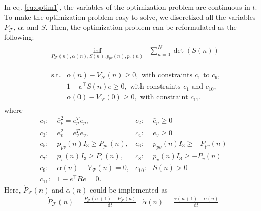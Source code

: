 \documentclass[letterpaper, 10 pt, conference]{ieeeconf}  %
\begin{document}
In eq. \eqref{eq:optim1}, the variables of the optimization problem are continuous in $t$. 
To make the optimization problem easy to solve, 
we discretized all the variables $P_\mathcal{F}$, $\alpha$, and $S$. 
Then, the optimization problem can be reformulated as the following:
\begin{align}
&
\begin{array}{rl}
\displaystyle{\inf_{P_\mathcal{F}(n),\alpha(n),S(n),p_{pv}(n),p_v(n)}} & \sum_{n=0}^{N} \det(S(n)) \nonumber \\
\end{array} \nonumber \\
&
\begin{array}{rl}
\displaystyle{\text{s.t.}}& \dot{\alpha}(n) - \dot{V}_\mathcal{F}(n) \geq 0,\text{ with constraints $c_1$ to $c_9$}, \nonumber \\
& 1-e^\intercal S(n) e \geq 0,\text{ with constraints $c_1$ and $c_{10}$}, \nonumber \\
& \alpha(0) - V_\mathcal{F}(0) \geq 0,\text{ with constraint $c_{11}$}. \nonumber
\end{array} \nonumber 
\end{align}
where
\begin{equation}
\begin{array}{rlrl}
c_1:& \bar{e}_p^2 = e_p^Te_p,           & c_2:&\bar{e}_p \geq 0 \\
c_3:& \bar{e}_v^2 = e_v^Te_v,           & c_4:&\bar{e}_v \geq 0 \\
c_5:& p_{pv}(n)I_3 \geq P_{pv}(n),      & c_6:&p_{pv}(n)I_3 \geq -P_{pv}(n) \\
c_7:& p_{ v}(n)I_3 \geq P_{ v}(n),      & c_8:&p_{ v}(n)I_3 \geq -P_{ v}(n) \\
c_9:& \alpha(n) - V_\mathcal{F}(n) = 0, & c_{10}:&S(n) > 0 \\
c_{11}:& 1-e^\intercal R e = 0. &&
\end{array} \nonumber
\end{equation}
Here, $\dot{P}_\mathcal{F}(n)$ and $\dot{\alpha}(n)$ could be implemented as
\begin{equation}
\begin{array}{cc}
\dot{P}_\mathcal{F}(n) = \frac{P_\mathcal{F}(n+1) - P_\mathcal{F}(n)}{\text{d}t} & \dot{\alpha}(n) = \frac{\alpha(n+1)-\alpha(n)}{\text{d}t} 
\end{array} \nonumber
\end{equation}
\end{document}

